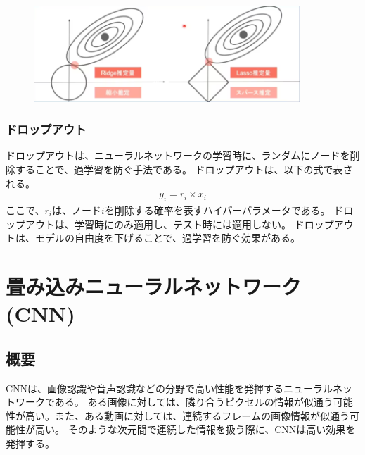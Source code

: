 \documentclass{ltjsarticle}
\begin{document}
\begin{figure}
  \centering
  \includegraphics[width=10cm]{./capture/confirm_test/day2_18_1.png}
  \caption{}
  \label{fig:day2_18_1}
\end{figure}



\subsubsection{ドロップアウト}
ドロップアウトは、ニューラルネットワークの学習時に、ランダムにノードを削除することで、過学習を防ぐ手法である。
ドロップアウトは、以下の式で表される。
\begin{align}
  y_i = r_i \times x_i
\end{align}
ここで、$r_i$は、ノード$i$を削除する確率を表すハイパーパラメータである。
ドロップアウトは、学習時にのみ適用し、テスト時には適用しない。
ドロップアウトは、モデルの自由度を下げることで、過学習を防ぐ効果がある。


\newpage
\section{畳み込みニューラルネットワーク(CNN)}
\subsection{概要}
CNNは、画像認識や音声認識などの分野で高い性能を発揮するニューラルネットワークである。
ある画像に対しては、隣り合うピクセルの情報が似通う可能性が高い。また、ある動画に対しては、連続するフレームの画像情報が似通う可能性が高い。
そのような次元間で連続した情報を扱う際に、CNNは高い効果を発揮する。
\end{document}
